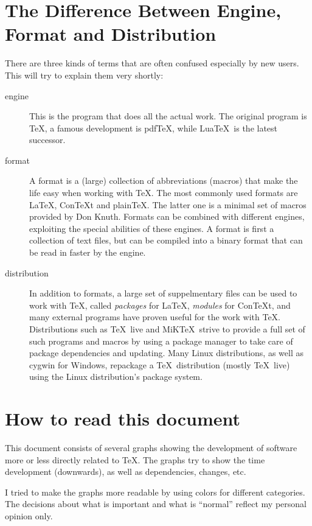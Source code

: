 \setlength{\columnsep}{1.5cm}
\newpage
\tableofcontents

\section{The Difference Between Engine, Format and Distribution}
There are three kinds of terms that are often confused especially by new users. This will try to explain them very shortly:
\begin{description}
\item[engine] This is the program that does all the actual work. The original program is \TeX, a famous development is pdf\TeX, while Lua\TeX\ is the latest successor.
\item[format] A format is a (large) collection of abbreviations (macros) that make the life easy when working with \TeX. The most commonly used formats are \LaTeX, Con\TeX t and plain\TeX. The latter one is a minimal set of macros provided by Don Knuth. Formats can be combined with different engines, exploiting the special abilities of these engines. A format is first a collection of text files, but can be compiled into a binary format that can be read in faster by the engine.
\item[distribution] In addition to formats, a large set of suppelmentary files can be used to work with \TeX, called \emph{packages} for \LaTeX, \emph{modules} for Con\TeX t, and many external programs have proven useful for the work with \TeX. Distributions such as \TeX~live and MiK\TeX\ strive to provide a full set of such programs and macros by using a package manager to take care of package dependencies and updating. Many Linux distributions, as well as cygwin for Windows, repackage a \TeX\ distribution (mostly \TeX~live) using the Linux distribution's package system.
\end{description}

\section{How to read this document}
This document consists of several graphs showing the development of software more or less directly related to \TeX. The graphs try to show the time  development (downwards), as well as dependencies, changes, etc.

I tried to make the graphs more readable by using colors for different categories. The decisions about what is important and what is “normal” reflect my personal opinion only.

